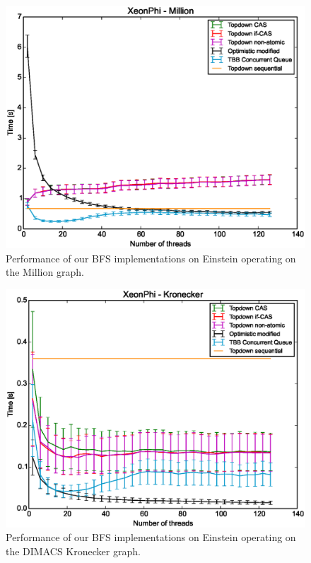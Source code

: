 \documentclass[letterpaper]{article}
\begin{document}
		\begin{figure}[t]
			\centering
	  		\includegraphics[scale=0.33]{einstein_million.eps}
	  		\vspace*{-0.3cm}
	  		\caption{Performance of our BFS implementations on Einstein operating on the Million graph.\label{fig:einsteinbig}}
		\end{figure}
		
		\begin{figure}[t]
			\centering
	  		\includegraphics[scale=0.33]{einstein_dimacskron.eps}
	  		\vspace*{-0.3cm}
	  		\caption{Performance of our BFS implementations on Einstein operating on the DIMACS Kronecker graph.\label{fig:einsteinkron}}
		\end{figure}
\end{document}
